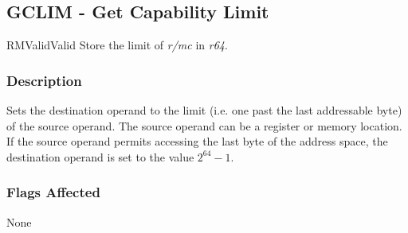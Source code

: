 \clearpage
{}
{}
\subsection*{GCLIM - Get Capability Limit}

\begin{x86opcodetable}
  {RM}{Valid}{Valid}
  {Store the limit of \emph{r/mc} in \emph{r64}.}
\end{x86opcodetable}

\begin{x86opentable}
\end{x86opentable}

\subsubsection*{Description}

Sets the destination operand to the limit (i.e. one past the last
addressable byte) of the source operand.  The source operand can be a
register or memory location.  If the source operand permits accessing
the last byte of the address space, the destination operand is set to
the value $2^{64}-1$.

\subsubsection*{Flags Affected}

None
